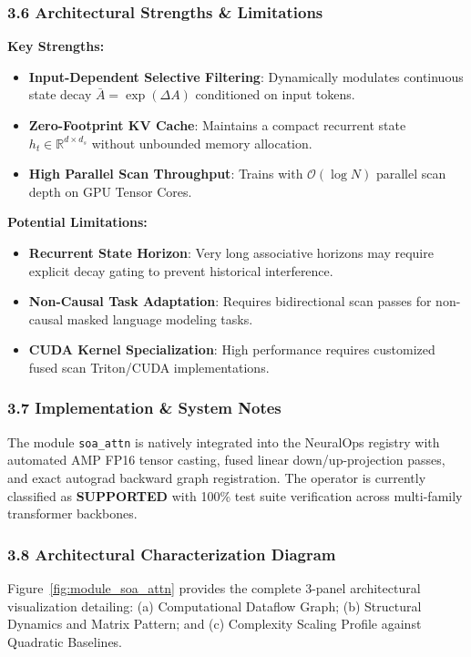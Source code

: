 \subsubsection*{3.6 Architectural Strengths \& Limitations}
\textbf{Key Strengths:}
\begin{itemize}
    \item \textbf{Input-Dependent Selective Filtering}: Dynamically modulates continuous state decay $\bar{A} = \exp(\Delta A)$ conditioned on input tokens.
    \item \textbf{Zero-Footprint KV Cache}: Maintains a compact recurrent state $h_t \in \mathbb{R}^{d \times d_s}$ without unbounded memory allocation.
    \item \textbf{High Parallel Scan Throughput}: Trains with $\mathcal{O}(\log N)$ parallel scan depth on GPU Tensor Cores.
\end{itemize}

\textbf{Potential Limitations:}
\begin{itemize}
    \item \textbf{Recurrent State Horizon}: Very long associative horizons may require explicit decay gating to prevent historical interference.
    \item \textbf{Non-Causal Task Adaptation}: Requires bidirectional scan passes for non-causal masked language modeling tasks.
    \item \textbf{CUDA Kernel Specialization}: High performance requires customized fused scan Triton/CUDA implementations.
\end{itemize}

\subsubsection*{3.7 Implementation \& System Notes}
The module \texttt{soa\_attn} is natively integrated into the NeuralOps registry with automated AMP FP16 tensor casting, fused linear down/up-projection passes, and exact autograd backward graph registration. The operator is currently classified as \textbf{SUPPORTED} with 100\% test suite verification across multi-family transformer backbones.

\subsubsection*{3.8 Architectural Characterization Diagram}
Figure~\ref{fig:module_soa_attn} provides the complete 3-panel architectural visualization detailing: (a) Computational Dataflow Graph; (b) Structural Dynamics and Matrix Pattern; and (c) Complexity Scaling Profile against Quadratic Baselines.

